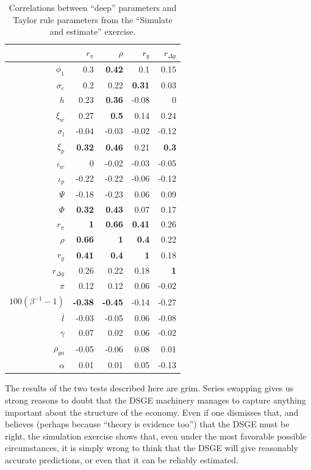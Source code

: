 \documentclass[11pt]{article}
\begin{document}
\begin{table}

\caption{\label{tab:covary-with-Taylor}Correlations between ``deep'' parameters and Taylor rule parameters from the ``Simulate and estimate'' exercise.}
\centering
\begin{tabular}[t]{rrrrr}
\toprule
 & $r_\pi$ & $\rho$ & $r_y$ & $r_{\Delta y}$\\
\midrule
$\phi_1$ & 0.3 & \textbf{0.42} & 0.1 & 0.15\\
$\sigma_c$ & 0.2 & 0.22 & \textbf{0.31} & 0.03\\
$h$ & 0.23 & \textbf{0.36} & -0.08 & 0\\
$\xi_w$ & 0.27 & \textbf{0.5} & 0.14 & 0.24\\
$\sigma_l$ & -0.04 & -0.03 & -0.02 & -0.12\\
\addlinespace
$\xi_p$ & \textbf{0.32} & \textbf{0.46} & 0.21 & \textbf{0.3}\\
$\iota_w$ & 0 & -0.02 & -0.03 & -0.05\\
$\iota_p$ & -0.22 & -0.22 & -0.06 & -0.12\\
$\Psi$ & -0.18 & -0.23 & 0.06 & 0.09\\
$\Phi$ & \textbf{0.32} & \textbf{0.43} & 0.07 & 0.17\\
\addlinespace
$r_\pi$ & \textbf{1} & \textbf{0.66} & \textbf{0.41} & 0.26\\
$\rho$ & \textbf{0.66} & \textbf{1} & \textbf{0.4} & 0.22\\
$r_y$ & \textbf{0.41} & \textbf{0.4} & \textbf{1} & 0.18\\
$r_{\Delta y}$ & 0.26 & 0.22 & 0.18 & \textbf{1}\\
$\overline{\pi}$ & 0.12 & 0.12 & 0.06 & -0.02\\
\addlinespace
$100(\beta^{-1} -1)$ & \textbf{-0.38} & \textbf{-0.45} & -0.14 & -0.27\\
$\overline{l}$ & -0.03 & -0.05 & 0.06 & -0.08\\
$\overline{\gamma}$ & 0.07 & 0.02 & 0.06 & -0.02\\
$\rho_{ga}$ & -0.05 & -0.06 & 0.08 & 0.01\\
$\alpha$ & 0.01 & 0.01 & 0.05 & -0.13\\
\bottomrule
\end{tabular}
\end{table}

The results of the two tests described here are grim. Series swapping
gives us strong reasons to doubt that the DSGE machinery manages to
capture anything important about the structure of the economy. Even if
one dismisses that, and believes (perhaps because ``theory is evidence
too'') that the DSGE must be right, the simulation exercise shows that,
even under the most favorable possible circumstances, it is simply wrong
to think that the DSGE will give reasonably accurate predictions, or
even that it can be reliably estimated.
\end{document}
